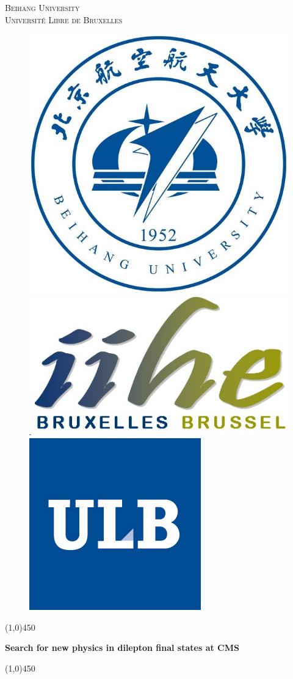 \begin{titlepage}
    \begin{center}
        \begin{Large}
        \textsc{ Beihang University\\ Universit\'e Libre de Bruxelles}\\
        \vspace*{0.2cm}
        \end{Large}
        \vspace*{1cm}
        \begin{figure}
        \begin{center}
          \includegraphics[height=0.14\textwidth,valign=t]{figures/logo_buaa.jpg}
          \hspace{3cm}
          \includegraphics[height=0.14\textwidth,valign=t]{figures/logo_iihe.jpg}
          \hspace{3cm}
          \includegraphics[height=0.14\textwidth, valign=t]{figures/logonorm_ulb.jpg}
        \end{center}
        \end{figure}
        \vspace*{1cm}

        \line(1,0){450}
        \vspace*{0.4cm}
        \begin{huge}
        \textbf{Search for new physics in dilepton final states at CMS}
        \end{huge}
        \line(1,0){450}

        \vspace{1.5cm}
         \begin{Large}
        \vspace*{0.5cm}


\end{Large}
\end{center}
\end{titlepage}

